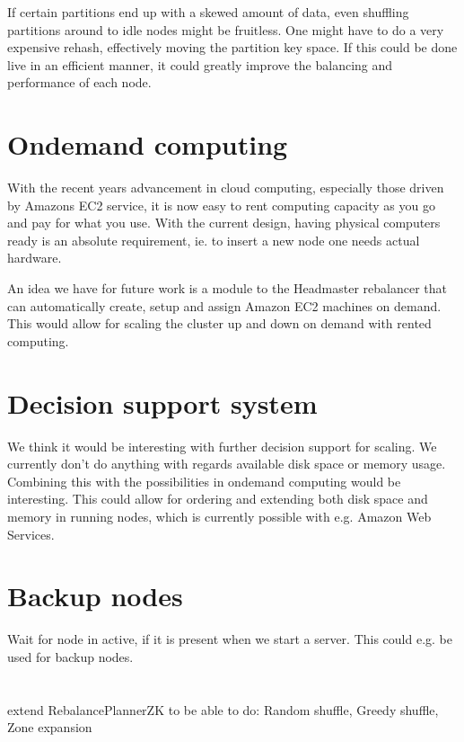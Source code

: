 If certain partitions end up with a skewed amount of data, even shuffling partitions around to idle nodes might be fruitless. One might have to do a very expensive rehash, effectively moving the partition key space. If this could be done live in an efficient manner, it could greatly improve the balancing and performance of each node.

\section{Ondemand computing}
With the recent years advancement in cloud computing, especially those driven by Amazons EC2 service, it is now easy to rent computing capacity as you go and pay for what you use.
With the current design, having physical computers ready is an absolute requirement, ie. to insert a new node one needs actual hardware.

An idea we have for future work is a module to the Headmaster rebalancer that can automatically create, setup and assign Amazon EC2 machines on demand. This would allow for scaling the cluster up and down on demand with rented computing.

\section{Decision support system}
We think it would be interesting with further decision support for scaling. We currently don't do anything with regards available disk space or memory usage. 
Combining this with the possibilities in ondemand computing would be interesting.
This could allow for ordering and extending both disk space and memory in running nodes, which is currently possible with e.g. Amazon Web Services.

\section{Backup nodes}
Wait for node in active, if it is present when we start a server. This could e.g. be used for backup nodes.

\section{}
extend RebalancePlannerZK to be able to do: Random shuffle, Greedy shuffle, Zone expansion
